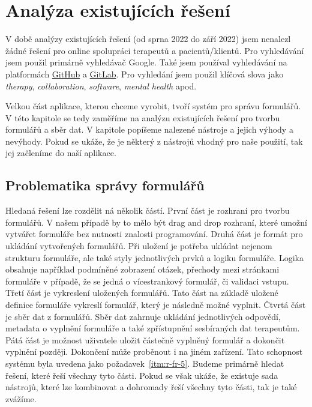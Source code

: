 \chapter{Analýza existujících řešení}\label{ch:analyza-existujicich-reseni-pro-praci-s-formulari}

V době analýzy existujících řešení (od sprna 2022 do září 2022) jsem nenalezl žádné řešení pro online spolupráci terapeutů a pacientů/klientů.
Pro vyhledávání jsem použil primárně vyhledávač Google.
Také jsem používal vyhledávání na platformách \href{https://github.com/}{GitHub} a \href{https://about.gitlab.com/}{GitLab}.
Pro vyhledání jsem použil klíčová slova jako \textit{therapy}, \textit{collaboration}, \textit{software}, \textit{mental health} apod.

Velkou část aplikace, kterou chceme vyrobit, tvoří systém pro správu formulářů.
V této kapitole se tedy zaměříme na analýzu existujících řešení pro tvorbu formulářů a sběr dat.
V kapitole popíšeme nalezené nástroje a jejich výhody a nevýhody.
Pokud se ukáže, že je některý z nástrojů vhodný pro naše použití, tak jej začleníme do naší aplikace.


\section{Problematika správy formulářů}\label{sec:problematika-spravy-formularu}

Hledaná řešení lze rozdělit ná několik částí.
První část je rozhraní pro tvorbu formulářů.
V našem případě by to mělo být drag and drop rozhraní, které umožní vytvářet formuláře bez nutnosti znalosti programování.
Druhá část je formát pro ukládání vytvořených formulářů.
Při uložení je potřeba ukládat nejenom strukturu formuláře, ale také styly jednotlivých prvků a logiku formuláře.
Logika obsahuje například podmíněné zobrazení otázek, přechody mezi stránkami formuláře v případě, že se jedná o vícestrankový formulář, či validaci vstupu.
Třetí část je vykreslení uložených formulářů.
Tato část na základě uložené definice formuláře vykreslí formulář, který je následně možné vyplnit.
Čtvrtá část je sběr dat z formulářů.
Sběr dat zahrnuje ukládání jednotlivých odpovědí, metadata o vyplnění formuláře a také zpřístupnění sesbíraných dat terapeutům.
Pátá část je možnost uživatele uložit částečně vyplněný formulář a dokončit vyplnění později.
Dokončení může proběnout i na jiném zařízení.
Tato schopnost systému byla uvedena jako požadavek~\ref{itm:r-fr-5}.
Budeme primárně hledat řešení, které řeší všechny tyto části.
Pokud se však ukáže, že existuje sada nástrojů, které lze kombinovat a dohromady řeší všechny tyto části, tak je také zvážíme.

